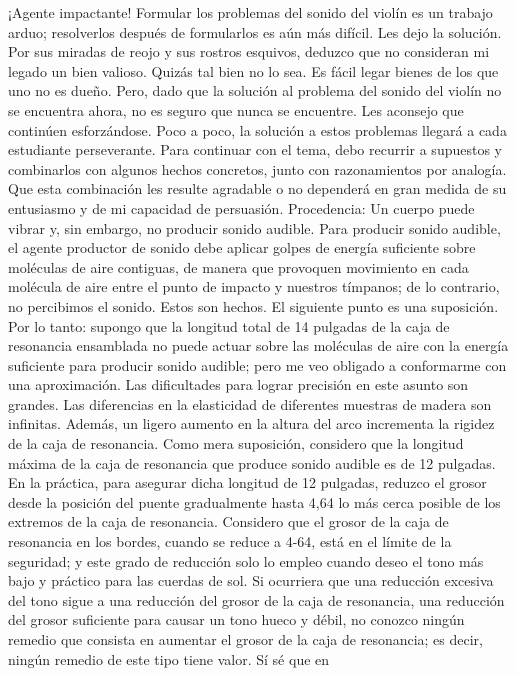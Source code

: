 ¡Agente impactante!
Formular los problemas del sonido del violín es un trabajo arduo; resolverlos después de formularlos es aún más difícil. Les dejo la solución. Por sus miradas de reojo y sus rostros esquivos, deduzco que no consideran mi legado un bien valioso. Quizás tal bien no lo sea. Es fácil legar bienes de los que uno no es dueño. Pero, dado que la solución al problema del sonido del violín no se encuentra ahora, no es seguro que nunca se encuentre. Les aconsejo que continúen esforzándose. Poco a poco, la solución a estos problemas llegará a cada estudiante perseverante.
Para continuar con el tema, debo recurrir a supuestos y combinarlos con algunos hechos concretos, junto con razonamientos por analogía. Que esta combinación les resulte agradable o no dependerá en gran medida de su entusiasmo y de mi capacidad de persuasión.
Procedencia: Un cuerpo puede vibrar y, sin embargo, no \label{sonido_audible}
producir sonido audible. Para producir sonido audible, el agente productor de sonido debe aplicar golpes de energía suficiente sobre moléculas de aire contiguas, de manera que provoquen movimiento en cada molécula de aire entre el punto de impacto y nuestros tímpanos; de lo contrario, no percibimos el sonido. Estos son hechos. El siguiente punto es una suposición. Por lo tanto: supongo que la longitud total de 14 pulgadas de la caja de resonancia ensamblada no puede actuar sobre las moléculas de aire con la energía suficiente para producir sonido audible; pero me veo obligado a conformarme con una aproximación. Las dificultades para lograr precisión en este asunto son grandes. Las diferencias en la elasticidad de diferentes muestras de madera son infinitas. Además, un ligero aumento en la altura del arco incrementa la rigidez de la caja de resonancia. Como mera suposición, considero que la longitud máxima de la caja de resonancia que produce sonido audible es de 12 pulgadas. En la práctica, para asegurar dicha longitud de 12 pulgadas, reduzco el grosor desde la posición del puente gradualmente hasta 4,64 lo más cerca posible de los extremos de la caja de resonancia. Considero que el grosor de la caja de resonancia en los bordes, cuando se reduce a 4-64, está en el límite de la seguridad; y este grado de reducción solo lo empleo cuando deseo el tono más bajo y práctico para las cuerdas de sol.
Si ocurriera que una reducción excesiva del tono sigue a una reducción del grosor de la caja de resonancia, una reducción del grosor suficiente para causar un tono hueco y débil, no conozco ningún remedio que consista en aumentar el grosor de la caja de resonancia; es decir, ningún remedio de este tipo tiene valor. Sí sé que en
